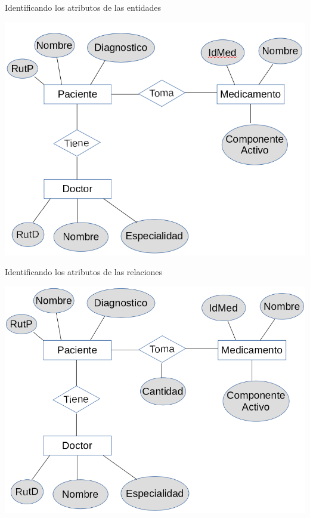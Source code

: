 \documentclass[11pt]{beamer}
\begin{document}
\begin{frame}{Identificando los atributos de las entidades}

\begin{center}
\includegraphics[scale=.5]{images/3} 
\end{center}

\end{frame}


\begin{frame}{Identificando los atributos de las relaciones}


\begin{center}
\includegraphics[scale=.47]{images/4} 
\end{center}

\end{frame}
\end{document}
